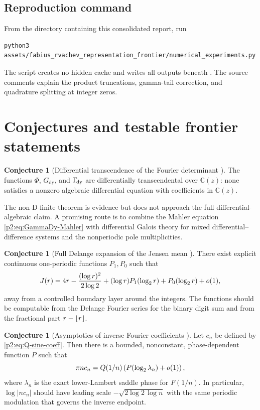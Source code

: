 \documentclass[11pt]{article}
\theoremstyle{definition}
\newtheorem{conjecture}[theorem]{Conjecture}
\theoremstyle{remark}
\newcommand{\C}{\mathbb C}
\begin{document}
\subsection{Reproduction command}

From the directory containing this consolidated report, run
\begin{lstlisting}[style=pythonstyle]
python3 assets/fabius_rvachev_representation_frontier/numerical_experiments.py
\end{lstlisting}
The script creates no hidden cache and writes all outputs beneath
.  The source comments explain
the product truncations, gamma-tail correction, and quadrature splitting at integer zeros.

\section{Conjectures and testable frontier statements}
\label{p2:sec:conjectures}

\begin{conjecture}[Differential transcendence of the Fourier determinant \Conj]
The functions $\Phi$, $G_{\mathrm{dy}}$, and $\Gamma_{\!\mathrm{dy}}$ are differentially transcendental
over $\C(z)$: none satisfies a nonzero algebraic differential equation with coefficients in
$\C(z)$.
\end{conjecture}

The non-D-finite theorem is evidence but does not approach the full differential-algebraic
claim.  A promising route is to combine the Mahler equation
\eqref{p2:eq:GammaDy-Mahler} with differential Galois theory for mixed differential--difference
systems and the nonperiodic pole multiplicities.

\begin{conjecture}[Full Delange expansion of the Jensen mean \Conj]
There exist explicit continuous one-periodic functions $P_1,P_0$ such that
\begin{equation}
 J(r)=4r-\frac{(\log r)^2}{2\log2}
      +(\log r)P_1(\log_2r)+P_0(\log_2r)+o(1),      \label{p2:eq:J-Delange-conj}
\end{equation}
away from a controlled boundary layer around the integers.  The functions should be
computable from the Delange Fourier series for the binary digit sum and from the fractional
part $r-\left\lfloor r\right\rfloor$.
\end{conjecture}

\begin{conjecture}[Asymptotics of inverse Fourier coefficients \Conj]
Let $c_n$ be defined by \eqref{p2:eq:Q-sine-coeff}.  Then there is a bounded, nonconstant,
phase-dependent function $P$ such that
\begin{equation}
 \pi n c_n
 =Q(1/n)\left(P(\log_2\lambda_n)+o(1)\right),      \label{p2:eq:cn-conj}
\end{equation}
where $\lambda_n$ is the exact lower-Lambert saddle phase for $F(1/n)$.  In particular,
$\log|nc_n|$ should have leading scale
$-\sqrt{2\log2\,\log n}$ with the same periodic modulation that governs the inverse endpoint.
\end{conjecture}
\end{document}
